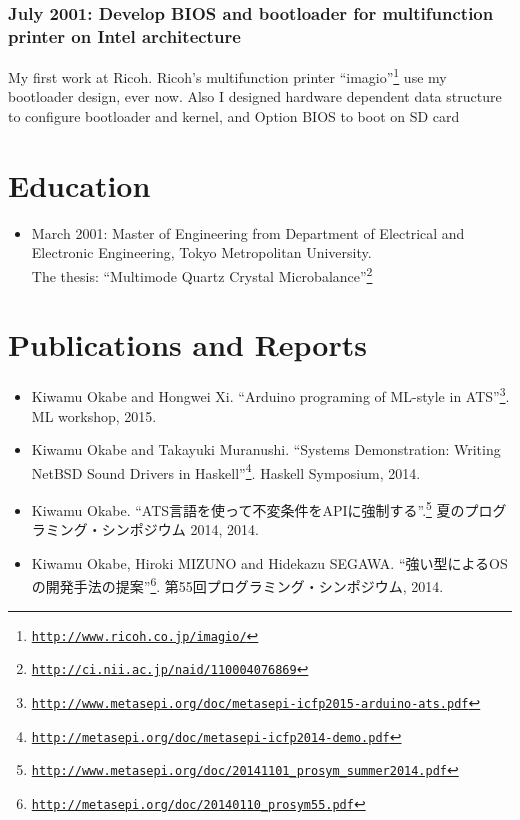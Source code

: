 \documentclass[letterpaper]{article}
\begin{document}
\subsubsection*{July 2001: Develop BIOS and bootloader for multifunction printer on Intel architecture}
My first work at Ricoh. Ricoh's multifunction printer
``imagio''\footnote{\href{http://www.ricoh.co.jp/imagio/}{\tt http://www.ricoh.co.jp/imagio/}}
use my bootloader design, ever now.
Also I designed hardware dependent data structure to configure bootloader and kernel,
and Option BIOS to boot on SD card

\section*{Education}

\begin{itemize}
  \item March 2001: Master of Engineering from Department of Electrical and Electronic Engineering, Tokyo Metropolitan University. \\
    The thesis: ``Multimode Quartz Crystal Microbalance''\footnote{\href{http://ci.nii.ac.jp/naid/110004076869}{\tt http://ci.nii.ac.jp/naid/110004076869}}
\end{itemize}

\section*{Publications and Reports}

\begin{itemize}
  \item Kiwamu Okabe and Hongwei Xi. ``Arduino programing of ML-style in ATS''\footnote{\href{http://www.metasepi.org/doc/metasepi-icfp2015-arduino-ats.pdf}{\tt http://www.metasepi.org/doc/metasepi-icfp2015-arduino-ats.pdf}}. ML workshop, 2015.
  \item Kiwamu Okabe and Takayuki Muranushi. ``Systems Demonstration: Writing NetBSD Sound Drivers in Haskell''\footnote{\href{http://metasepi.org/doc/metasepi-icfp2014-demo.pdf}{\tt http://metasepi.org/doc/metasepi-icfp2014-demo.pdf}}. Haskell Symposium, 2014.
  \item Kiwamu Okabe. ``ATS言語を使って不変条件をAPIに強制する''.\footnote{\href{http://www.metasepi.org/doc/20141101\_prosym\_summer2014.pdf}{\tt http://www.metasepi.org/doc/20141101\_prosym\_summer2014.pdf}} 夏のプログラミング・シンポジウム 2014, 2014.
  \item Kiwamu Okabe, Hiroki MIZUNO and Hidekazu SEGAWA. ``強い型によるOSの開発手法の提案''\footnote{\href{http://metasepi.org/doc/20140110\_prosym55.pdf}{\tt http://metasepi.org/doc/20140110\_prosym55.pdf}}. 第55回プログラミング・シンポジウム, 2014.
\end{itemize}
\end{document}
